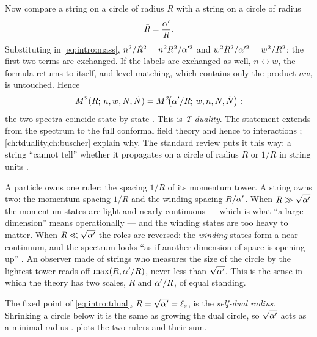 Now compare a string on a circle of radius $R$ with a string on a circle of radius
\begin{equation}\label{eq:intro:tdual}
  \tilde R=\frac{\alpha'}{R}.
\end{equation}
Substituting in \eqref{eq:intro:mass}, $n^2/\tilde R^2=n^2R^2/\alpha'^2$ and
$w^2\tilde R^2/\alpha'^2=w^2/R^2$: the first two terms are exchanged. If the labels are exchanged
as well, $n\leftrightarrow w$, the formula returns to itself, and level matching, which
contains only the product $nw$, is untouched. Hence
\begin{equation}\label{eq:intro:tduality}
  M^2(R;\,n,w,N,\tilde N)=M^2\!\big(\alpha'/R;\,w,n,N,\tilde N\big):
\end{equation}
the two spectra coincide state by state . This is
\emph{T-duality}. The statement extends from the spectrum to the full
conformal field theory and hence to interactions  \TL;
\cref{ch:tduality,ch:buscher} explain why. The standard review puts it this way: a string
``cannot tell'' whether it propagates on a circle of radius $R$ or $1/R$ in string units
.

\begin{physicsbox}
A particle owns one ruler: the spacing $1/R$ of its momentum tower. A string owns two: the
momentum spacing $1/R$ and the winding spacing $R/\alpha'$. When $R\gg\sqrt{\alpha'}$ the momentum
states are light and nearly continuous --- which is what ``a large dimension'' means
operationally --- and the winding states are too heavy to matter. When $R\ll\sqrt{\alpha'}$ the
roles are reversed: the \emph{winding} states form a near-continuum, and the spectrum looks
``as if another dimension of space is opening up'' . An
observer made of strings who measures the size of the circle by the lightest tower reads off
$\max(R,\alpha'/R)$, never less than $\sqrt{\alpha'}$. This is the sense in which the theory has two
scales, $R$ and $\alpha'/R$, of equal standing.
\end{physicsbox}

The fixed point of \eqref{eq:intro:tdual}, $R=\sqrt{\alpha'}=\ell_s$, is the \emph{self-dual
radius}. Shrinking a circle below it is the same as growing the dual
circle, so $\sqrt{\alpha'}$ acts as a minimal radius .
 plots the two rulers and their sum.

